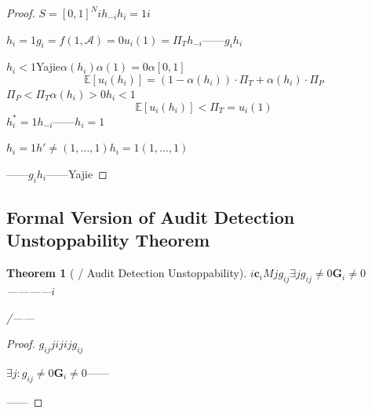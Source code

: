 \documentclass[12pt,a4paper]{article}
\newtheorem{theorem}{Theorem}[section]
\theoremstyle{remark}
\newcommand{\gradient}{g}
\begin{document}
\begin{proof}
    $S = [0,1]^N$$i$$h_{-i}$$h_i = 1$$i$

    $h_i = 1$$\gradient_i = f(1, \mathcal{A}) = 0$$u_i(1) = \Pi_T$$h_{-i}$——$\gradient_i$$h_i$

    $h_i < 1$Yajie$\alpha(h_i)$$\alpha(1) = 0$$\alpha$$[0,1]$
    \begin{equation}
        \mathbb{E}[u_i(h_i)] = (1 - \alpha(h_i)) \cdot \Pi_T + \alpha(h_i) \cdot \Pi_P
    \end{equation}
    $\Pi_P < \Pi_T$$\alpha(h_i) > 0$$h_i < 1$
    \begin{equation}
        \mathbb{E}[u_i(h_i)] < \Pi_T = u_i(1)
    \end{equation}
    $h_i^* = 1$$h_{-i}$——$h_i=1$

    $h_i=1$$h' \neq (1,\ldots,1)$$h_i=1$$(1,\ldots,1)$

    ——$\gradient_i$$h_i$——Yajie
\end{proof}

\subsection{}
\subsection{Formal Version of Audit Detection Unstoppability Theorem}

\begin{theorem}[ / Audit Detection Unstoppability]\label{thm:unconcealability_formal}
    $i$$\mathbf{c}_i$$M$$j$$\gradient_{ij}$\textbf{}$\exists j$$\gradient_{ij} \neq 0$$\mathbf{G}_i \neq 0$————$i$
    
    \textbf{}/——
\end{theorem}

\begin{proof}
    $\gradient_{ij}$$j$$i$$j$$i$$j$$\gradient_{ij}$

    $\exists j: \gradient_{ij} \neq 0$$\mathbf{G}_i \neq 0$——

    \textbf{}——
\end{proof}


\section{}
\end{document}

